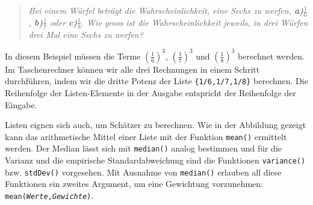 \documentclass[a4paper,11pt,notitlepage,halfparskip,headsepline,normalheadings,twoside]{scrartcl}
\begin{document}
\begin{quote}\textsl{Bei einem Würfel beträgt die Wahrscheinlichkeit, eine Sechs
zu werfen, \textbf{a)}$\frac{1}{6}$, \textbf{b)}$\frac{1}{7}$ oder
\textbf{c)}$\frac{1}{8}$. Wie gross ist die Wahrscheinlichkeit jeweils, in drei
Würfen drei Mal eine Sechs zu werfen?}\end{quote}

\begin{window}
In diesem Beispiel müssen die Terme $\left(\frac{1}{6}\right)^3$,
$\left(\frac{1}{7}\right)^3$ und $\left(\frac{1}{8}\right)^3$ berechnet werden. Im
Taschenrechner können wir alle drei Rechnungen in einem Schritt durchführen,
indem wir die dritte Potenz der Liste \texttt{\{1/6,1/7,1/8\}} berechnen. Die
Reihenfolge der Listen-Elemente in der Ausgabe entspricht der Reihenfolge der
Eingabe.
\end{window}

\begin{window}
Listen eignen sich auch, um Schätzer zu berechnen. Wie in der Abbildung gezeigt kann
das arithmetische Mittel einer Liste mit der Funktion \texttt{mean()} ermittelt
werden. Der Median lässt sich mit \texttt{median()} analog bestimmen und für die
Varianz und die empirische Standardabweichung sind die Funktionen
\texttt{variance()} bzw. \texttt{stdDev()} vorgesehen. Mit Ausnahme von
\texttt{median()} erlauben all diese Funktionen ein zweites Argument, um eine
Gewichtung vorzunehmen: \texttt{mean(\textit{Werte},\textit{Gewichte})}.
\end{window}
\end{document}
